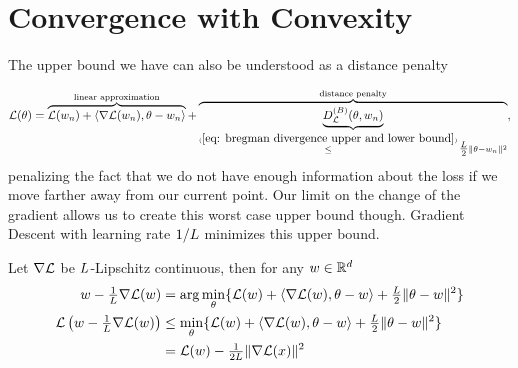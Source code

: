 \section{Convergence with Convexity}\label{sec: convex convergence theorems}

The upper bound we have can also be understood as a distance penalty

\begin{align}\label{eq: lin approx + distance penalty notion}
	\Loss(\theta)
	= \overbrace{
		\Loss(\weights_n)+ \langle\nabla\Loss(\weights_n), \theta-\weights_n\rangle 
	}^{\text{linear approximation}}
	+ \overbrace{\underbrace{\bregmanDiv{\Loss}(\theta,\weights_n)}_{
		\xle{(\ref{eq: bregman divergence upper and lower bound})}
		\tfrac\ubound{2} \|\theta-\weights_n\|^2 
	}}^{\text{distance penalty}},
\end{align}
%
penalizing the fact that we do not have enough information about the loss if we
move farther away from our current point. Our limit on the change of the gradient
allows us to create this worst case upper bound though.
Gradient Descent with learning rate \(1/L\) minimizes this upper bound.
%
\begin{lemma}\label{lem: smallest upper bound}
	Let \(\nabla \mathcal{L}\) be \(L\)-Lipschitz continuous, then for any \(w\in\mathbb{R}^d\)
	\begin{align}
		w - \tfrac{1}{L}\nabla \mathcal{L}(w) 
		&= \arg\min_{\theta}\{
			\mathcal{L}(w)+ \langle\nabla \mathcal{L}(w), \theta-w\rangle + \tfrac{L}{2}\|\theta-w\|^2 
		\}\\
		\label{eq: min approximation}
		\mathcal{L}\left(w-\tfrac{1}{L}\nabla\mathcal{L}(w)\right)
		&\le \min_{\theta} \{
			\mathcal{L}(w)+ \langle\nabla \mathcal{L}(w), \theta-w\rangle
			+ \tfrac{L}{2}\|\theta-w\|^2 
		\} \\ \nonumber
		&= \mathcal{L}(w) - \tfrac{1}{2L} \|\nabla \mathcal{L}(x)\|^2
	\end{align}
\end{lemma}
